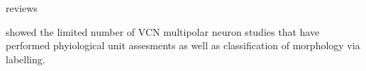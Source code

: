 \documentclass[10pt,a4paper,twoside,openright]{book}
\begin{document}



reviews \citep{BruggeGeisler:1978}

\citet{DoucetRyugo:2006} showed the limited number of VCN multipolar neuron studies that have performed phyiological unit assesments as well as classification of morphology via labelling.

\end{document}
